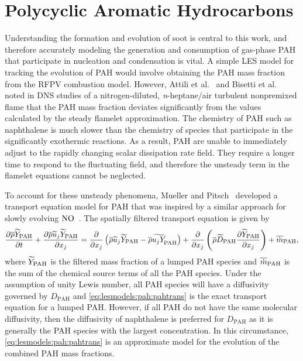 \section{Polycyclic Aromatic Hydrocarbons}
\label{sec:lesmodels:pah}

Understanding the formation and evolution of soot is central to this work, and therefore accurately modeling the generation and consumption of gas-phase PAH that participate in nucleation and condensation is vital. A simple LES model for tracking the evolution of PAH would involve obtaining the PAH mass fraction from the RFPV combustion model. However, Attili et al.~\cite{attili2014} and Bisetti et al.~\cite{bisetti2012} noted in DNS studies of a nitrogen-diluted, \textit{n}-heptane/air turbulent nonpremixed flame that the PAH mass fraction deviates significantly from the values calculated by the steady flamelet approximation. The chemistry of PAH such as naphthalene is much slower than the chemistry of species that participate in the significantly exothermic reactions. As a result, PAH are unable to immediately adjust to the rapidly changing scalar dissipation rate field. They require a longer time to respond to the fluctuating field, and therefore the unsteady term in the flamelet equations cannot be neglected.

To account for these unsteady phenomena, Mueller and Pitsch~\cite{mueller2012} developed a transport equation model for PAH that was inspired by a similar approach for slowly evolving $\ce{NO}$~\cite{ihme2008}. The spatially filtered transport equation is given by
\begin{equation}\label{eq:lesmodels:pah:pahtrans}
  \ftrder{\tf{Y}_{\text{PAH}}} = \dsff[\tf{Y}_{\text{PAH}}]{\tf{u_j Y}_{\hspace{-3pt}\text{PAH}}} + \fdt[\text{PAH}]{\tf{Y}_{\text{PAH}}} + \fst[m]{\text{PAH}},
\end{equation}
where $\tf{Y}_{\text{PAH}}$ is the filtered mass fraction of a lumped PAH species and $\fst[m]{\text{PAH}}$ is the sum of the chemical source terms of all the PAH species. Under the assumption of unity Lewis number, all PAH species will have a diffusivity governed by $D_{\text{PAH}}$ and \cref{eq:lesmodels:pah:pahtrans} is the exact transport equation for a lumped PAH. However, if all PAH do not have the same molecular diffusivity, then the diffusivity of naphthalene is preferred for $D_{\text{PAH}}$ as it is generally the PAH species with the largest concentration. In this circumstance, \cref{eq:lesmodels:pah:pahtrans} is an approximate model for the evolution of the combined PAH mass fractions.

